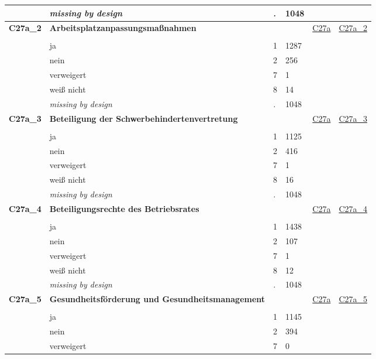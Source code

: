 \begin{longtable}{| L{2.45cm} | L{6cm} | C{1.5cm} | R{1cm} | C{2.25cm} | C{2.25cm} |}
   & \textit{missing by design} & \textit{.} & 1048 &  &  \\ 
   \midrule
\textbf{C27a\_2}\label{var:C27a:2} & \textbf{Arbeitsplatzanpassungsmaßnahmen} &  &  & \hyperref[C27a]{C27a} & \hyperref[var:suf:C27a:2]{C27a\_2} \\ 
   &  &  &  &  &  \\ 
   & ja & 1 & 1287 &  &  \\ 
   & nein & 2 & 256 &  &  \\ 
   & verweigert & 7 & 1 &  &  \\ 
   & weiß nicht & 8 & 14 &  &  \\ 
   & \textit{missing by design} & \textit{.} & 1048 &  &  \\ 
   \midrule
\textbf{C27a\_3}\label{var:C27a:3} & \textbf{Beteiligung der Schwerbehindertenvertretung} &  &  & \hyperref[C27a]{C27a} & \hyperref[var:suf:C27a:3]{C27a\_3} \\ 
   &  &  &  &  &  \\ 
   & ja & 1 & 1125 &  &  \\ 
   & nein & 2 & 416 &  &  \\ 
   & verweigert & 7 & 1 &  &  \\ 
   & weiß nicht & 8 & 16 &  &  \\ 
   & \textit{missing by design} & \textit{.} & 1048 &  &  \\ 
   \midrule
\textbf{C27a\_4}\label{var:C27a:4} & \textbf{Beteiligungsrechte des Betriebsrates} &  &  & \hyperref[C27a]{C27a} & \hyperref[var:suf:C27a:4]{C27a\_4} \\ 
   &  &  &  &  &  \\ 
   & ja & 1 & 1438 &  &  \\ 
   & nein & 2 & 107 &  &  \\ 
   & verweigert & 7 & 1 &  &  \\ 
   & weiß nicht & 8 & 12 &  &  \\ 
   & \textit{missing by design} & \textit{.} & 1048 &  &  \\ 
   \midrule
\textbf{C27a\_5}\label{var:C27a:5} & \textbf{Gesundheitsförderung und Gesundheitsmanagement} &  &  & \hyperref[C27a]{C27a} & \hyperref[var:suf:C27a:5]{C27a\_5} \\ 
   &  &  &  &  &  \\ 
   & ja & 1 & 1145 &  &  \\ 
   & nein & 2 & 394 &  &  \\ 
   & verweigert & 7 & 0 &  &  \\ 

\end{longtable}
